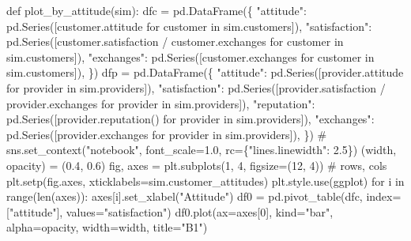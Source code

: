 \documentclass[
  letterpaper,
  DIV=11,
  numbers=noendperiod]{scrartcl}
\newenvironment{Shaded}{\begin{snugshade}}{\end{snugshade}}
\newcommand{\BuiltInTok}[1]{\textcolor[rgb]{0.00,0.23,0.31}{#1}}
\newcommand{\CommentTok}[1]{\textcolor[rgb]{0.37,0.37,0.37}{#1}}
\newcommand{\ControlFlowTok}[1]{\textcolor[rgb]{0.00,0.23,0.31}{#1}}
\newcommand{\DecValTok}[1]{\textcolor[rgb]{0.68,0.00,0.00}{#1}}
\newcommand{\FloatTok}[1]{\textcolor[rgb]{0.68,0.00,0.00}{#1}}
\newcommand{\KeywordTok}[1]{\textcolor[rgb]{0.00,0.23,0.31}{#1}}
\newcommand{\NormalTok}[1]{\textcolor[rgb]{0.00,0.23,0.31}{#1}}
\newcommand{\OperatorTok}[1]{\textcolor[rgb]{0.37,0.37,0.37}{#1}}
\newcommand{\StringTok}[1]{\textcolor[rgb]{0.13,0.47,0.30}{#1}}
\begin{document}
\begin{Shaded}
\begin{Highlighting}[]
\KeywordTok{def}\NormalTok{ plot\_by\_attitude(sim):}
\NormalTok{    dfc }\OperatorTok{=}\NormalTok{ pd.DataFrame(\{}
        \StringTok{"attitude"}\NormalTok{: pd.Series([customer.attitude }\ControlFlowTok{for}\NormalTok{ customer }\KeywordTok{in}\NormalTok{ sim.customers]),}
        \StringTok{"satisfaction"}\NormalTok{: pd.Series([customer.satisfaction }\OperatorTok{/}\NormalTok{ customer.exchanges }
                              \ControlFlowTok{for}\NormalTok{ customer }\KeywordTok{in}\NormalTok{ sim.customers]),}
        \StringTok{"exchanges"}\NormalTok{: pd.Series([customer.exchanges }\ControlFlowTok{for}\NormalTok{ customer }\KeywordTok{in}\NormalTok{ sim.customers]),}
\NormalTok{    \})}
\NormalTok{    dfp }\OperatorTok{=}\NormalTok{ pd.DataFrame(\{}
        \StringTok{"attitude"}\NormalTok{: pd.Series([provider.attitude }\ControlFlowTok{for}\NormalTok{ provider }\KeywordTok{in}\NormalTok{ sim.providers]),}
        \StringTok{"satisfaction"}\NormalTok{: pd.Series([provider.satisfaction }\OperatorTok{/}\NormalTok{ provider.exchanges }
                              \ControlFlowTok{for}\NormalTok{ provider }\KeywordTok{in}\NormalTok{ sim.providers]),}
        \StringTok{"reputation"}\NormalTok{: pd.Series([provider.reputation() }\ControlFlowTok{for}\NormalTok{ provider }\KeywordTok{in}\NormalTok{ sim.providers]),}
        \StringTok{"exchanges"}\NormalTok{: pd.Series([provider.exchanges }\ControlFlowTok{for}\NormalTok{ provider }\KeywordTok{in}\NormalTok{ sim.providers]),}
\NormalTok{    \})}
    \CommentTok{\# sns.set\_context("notebook", font\_scale=1.0, rc=\{"lines.linewidth": 2.5\})}
\NormalTok{    (width, opacity) }\OperatorTok{=}\NormalTok{ (}\FloatTok{0.4}\NormalTok{, }\FloatTok{0.6}\NormalTok{)}
\NormalTok{    fig, axes }\OperatorTok{=}\NormalTok{ plt.subplots(}\DecValTok{1}\NormalTok{, }\DecValTok{4}\NormalTok{, figsize}\OperatorTok{=}\NormalTok{(}\DecValTok{12}\NormalTok{, }\DecValTok{4}\NormalTok{)) }\CommentTok{\# rows, cols}
\NormalTok{    plt.setp(fig.axes, xticklabels}\OperatorTok{=}\NormalTok{sim.customer\_attitudes)}
\NormalTok{    plt.style.use(}\StringTok{\textquotesingle{}ggplot\textquotesingle{}}\NormalTok{)}
    \ControlFlowTok{for}\NormalTok{ i }\KeywordTok{in} \BuiltInTok{range}\NormalTok{(}\BuiltInTok{len}\NormalTok{(axes)):}
\NormalTok{        axes[i].set\_xlabel(}\StringTok{"Attitude"}\NormalTok{)}
\NormalTok{    df0 }\OperatorTok{=}\NormalTok{ pd.pivot\_table(dfc, index}\OperatorTok{=}\NormalTok{[}\StringTok{"attitude"}\NormalTok{], values}\OperatorTok{=}\StringTok{"satisfaction"}\NormalTok{)}
\NormalTok{    df0.plot(ax}\OperatorTok{=}\NormalTok{axes[}\DecValTok{0}\NormalTok{], kind}\OperatorTok{=}\StringTok{"bar"}\NormalTok{, alpha}\OperatorTok{=}\NormalTok{opacity, width}\OperatorTok{=}\NormalTok{width, title}\OperatorTok{=}\StringTok{"B1"}\NormalTok{)}

\end{Highlighting}
\end{Shaded}
\end{document}
